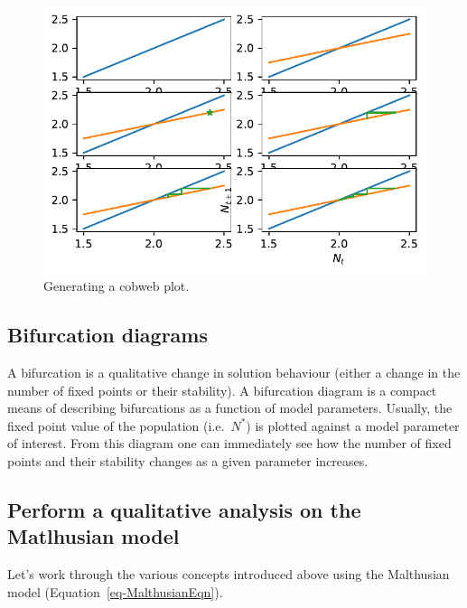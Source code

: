 \documentclass[
  letterpaper,
  DIV=11,
  numbers=noendperiod]{scrreprt}
\begin{document}
\begin{figure}

{\centering \includegraphics{MA32009-SinglePopDiscreteTimea_files/figure-pdf/fig-cobwebstepbystep-output-1.pdf}

}

\caption{\label{fig-cobwebstepbystep}Generating a cobweb plot.}

\end{figure}

\hypertarget{bifurcation-diagrams}{%
\subsection{Bifurcation diagrams}\label{bifurcation-diagrams}}

A bifurcation is a qualitative change in solution behaviour (either a
change in the number of fixed points or their stability). A bifurcation
diagram is a compact means of describing bifurcations as a function of
model parameters. Usually, the fixed point value of the population
(i.e.~\(N^*\)) is plotted against a model parameter of interest. From
this diagram one can immediately see how the number of fixed points and
their stability changes as a given parameter increases.

\hypertarget{perform-a-qualitative-analysis-on-the-matlhusian-model}{%
\subsection{Perform a qualitative analysis on the Matlhusian
model}\label{perform-a-qualitative-analysis-on-the-matlhusian-model}}

Let's work through the various concepts introduced above using the
Malthusian model (Equation~\ref{eq-MalthusianEqn}).
\end{document}
